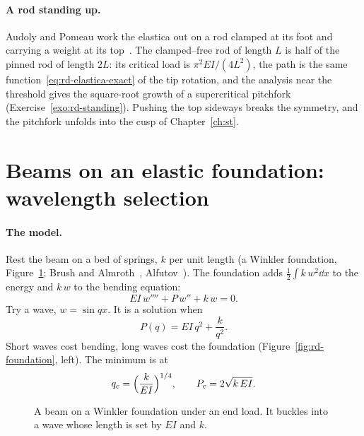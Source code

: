 \paragraph{A rod standing up.}
Audoly and Pomeau work the elastica out on a rod clamped at its foot and carrying a weight at
its top~\cite[Appendix~A]{rd-audoly2010}. The clamped--free rod of length $L$ is half of the
pinned rod of length $2L$: its critical load is $\pi^2EI/(4L^2)$, the path is the same
function~\eqref{eq:rd-elastica-exact} of the tip rotation, and the analysis near the threshold
gives the square-root growth of a supercritical pitchfork (Exercise~\ref{exo:rd-standing}).
Pushing the top sideways breaks the symmetry, and the pitchfork unfolds into the cusp of
Chapter~\ref{ch:st}.

\section{Beams on an elastic foundation: wavelength selection}\label{sec:rd-foundation}
%

\paragraph{The model.}
Rest the beam on a bed of springs, $k$ per unit length (a Winkler foundation,
Figure~\ref{fig:rd-foundation-sketch}; Brush and Almroth~\cite[Section~2.2d]{rd-brush1975},
Alfutov~\cite[Section~3.3]{rd-alfutov2000}). The foundation adds $\displaystyle\frac12\int k\,w^2\dd x$ to the
energy and $k\,w$ to the bending equation:
\begin{equation}\label{eq:rd-foundation-eq}
  EI\,w'''' + P\,w'' + k\,w = 0 .
\end{equation}
Try a wave, $w = \sin qx$. It is a solution when
\begin{equation}\label{eq:rd-Pq}
  P(q) = EI\,q^2 + \frac{k}{q^2} .
\end{equation}
Short waves cost bending, long waves cost the foundation (Figure~\ref{fig:rd-foundation},
left). The minimum is at
\begin{equation}\label{eq:rd-foundation-crit}
  q_c = \Bigl(\frac{k}{EI}\Bigr)^{1/4},
  \qquad
  P_c = 2\sqrt{k\,EI} .
\end{equation}

\begin{figure}[ht]
  \centering
  
  \caption{A beam on a Winkler foundation under an end load. It buckles into a wave whose
    length is set by $EI$ and $k$.}
  \label{fig:rd-foundation-sketch}
\end{figure}

